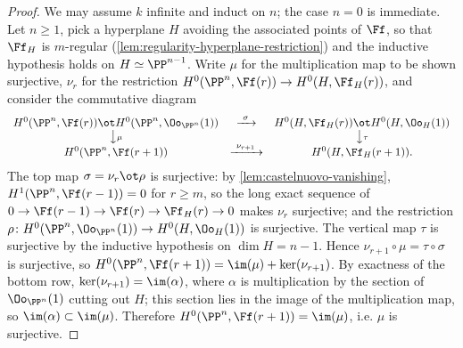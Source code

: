 \begin{proof}
  We may assume $k$ infinite and induct on $n$; the case $n=0$ is immediate.
  Let $n\ge1$, pick a hyperplane $H$ avoiding the associated points of $\Ff$, so
  that $\Ff_H$ is $m$-regular (\cref{lem:regularity-hyperplane-restriction}) and
  the inductive hypothesis holds on $H\simeq\PP^{n-1}$. Write $\mu$ for the
  multiplication map to be shown surjective, $\nu_r$ for the restriction
  $H^0(\PP^n,\Ff(r))\to H^0(H,\Ff_H(r))$, and consider the commutative diagram
  \[
    \begin{array}{ccc}
      H^0(\PP^n,\Ff(r))\ot H^0(\PP^n,\Oo_{\PP^n}(1))
        & \xrightarrow{\ \sigma\ }
        & H^0(H,\Ff_H(r))\ot H^0(H,\Oo_H(1)) \\
      \big\downarrow{\scriptstyle\mu} & & \big\downarrow{\scriptstyle\tau} \\
      H^0(\PP^n,\Ff(r+1)) & \xrightarrow{\ \nu_{r+1}\ } & H^0(H,\Ff_H(r+1)) .
    \end{array}
  \]
  The top map $\sigma=\nu_r\ot\rho$ is surjective: by
  \cref{lem:castelnuovo-vanishing}, $H^1(\PP^n,\Ff(r-1))=0$ for $r\ge m$, so the
  long exact sequence of $0\to\Ff(r-1)\to\Ff(r)\to\Ff_H(r)\to0$ makes $\nu_r$
  surjective; and the restriction
  $\rho\colon H^0(\PP^n,\Oo_{\PP^n}(1))\to H^0(H,\Oo_H(1))$ is surjective. The
  vertical map $\tau$ is surjective by the inductive hypothesis on $\dim H=n-1$.
  Hence $\nu_{r+1}\circ\mu=\tau\circ\sigma$ is surjective, so
  $H^0(\PP^n,\Ff(r+1)) = \im(\mu)+\ker(\nu_{r+1})$. By exactness of the bottom
  row, $\ker(\nu_{r+1})=\im(\alpha)$, where $\alpha$ is multiplication by the
  section of $\Oo_{\PP^n}(1)$ cutting out $H$; this section lies in the image of
  the multiplication map, so $\im(\alpha)\subset\im(\mu)$. Therefore
  $H^0(\PP^n,\Ff(r+1)) = \im(\mu)$, i.e. $\mu$ is surjective.
\end{proof}

